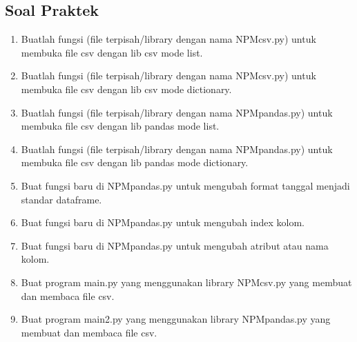 \subsection{Soal Praktek}
\begin{enumerate}

\item Buatlah  fungsi  (file  terpisah/library  dengan  nama  NPMcsv.py)  untuk  membuka file csv dengan lib csv mode list.	
	
	
\item Buatlah  fungsi  (file  terpisah/library  dengan  nama  NPMcsv.py)  untuk  membuka file csv dengan lib csv mode dictionary.
	
	
\item Buatlah fungsi (file terpisah/library dengan nama NPMpandas.py) untuk membuka file csv dengan lib pandas mode list.
	
	
\item Buatlah fungsi (file terpisah/library dengan nama NPMpandas.py) untuk membuka file csv dengan lib pandas mode dictionary.	
	
	
\item  Buat fungsi baru di NPMpandas.py untuk mengubah format tanggal menjadi standar dataframe.
	
	
\item Buat fungsi baru di NPMpandas.py untuk mengubah index kolom.
	
	
\item Buat fungsi baru di NPMpandas.py untuk mengubah atribut atau nama kolom.
	
	
\item Buat program main.py yang menggunakan library NPMcsv.py yang membuat dan membaca file csv.
	

\item Buat program main2.py yang menggunakan library NPMpandas.py yang membuat dan membaca file csv.
		
\end{enumerate}
